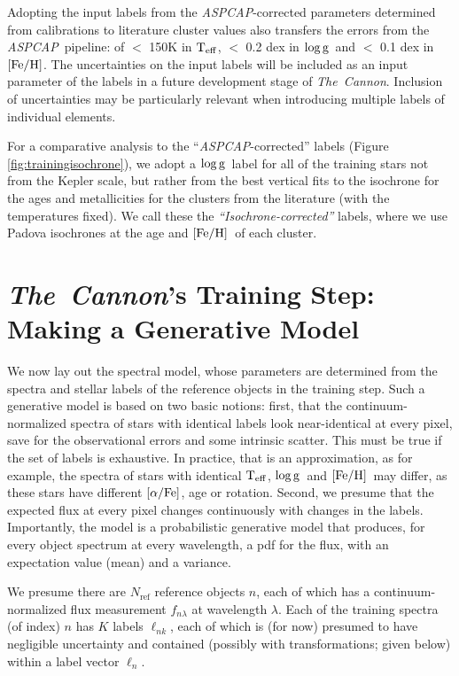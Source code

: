 \documentclass[12pt, preprint]{aastex}
\newcommand{\tc}{\textsl{The~Cannon}}
\newcommand{\aspcap}{\textsl{ASPCAP}}
\newcommand{\set}[1]{\bm{#1}}
\newcommand{\starlabel}{\ell}
\newcommand{\starlabelvec}{\set{\starlabel}}
\newcommand{\teff}{\mbox{$\rm T_{eff}$}}
\newcommand{\feh}{\mbox{$\rm [Fe/H]$}}
\newcommand{\alphafe}{\mbox{$\rm [\alpha/Fe]$}}
\newcommand{\logg}{\mbox{$\rm \log g$}}
\newcommand{\rfn}{\mathrm{ref}}
\begin{document}
Adopting the input labels from the \aspcap-corrected parameters determined from calibrations to literature cluster values also transfers the errors from the \aspcap\ pipeline: of $<$ 150K in \teff,  $<$ 0.2 dex in \logg\ and $<$ 0.1 dex in \feh.   
The uncertainties on the input labels will be included as an input parameter of the labels in a future development stage of \tc. Inclusion of uncertainties may be particularly relevant when introducing multiple labels of individual elements. 

For a comparative analysis to the ``\aspcap-corrected'' labels (Figure \ref{fig:trainingisochrone}), we adopt a \logg\ label for all of the training stars not from the Kepler scale, but rather from the best vertical fits to the isochrone for the ages and metallicities for the clusters from the literature (with the temperatures fixed).
We call these the \textit{``Isochrone-corrected''} labels, where we use Padova isochrones at the age and \feh\ of each cluster. 

\section{\tc 's Training Step: Making a Generative Model}
\label{sec:spectralmodel}

We now lay out the spectral model, whose parameters are determined 
from the spectra and stellar labels of the reference objects in the training step.
Such a generative model is based on two basic notions: first, that the continuum-normalized spectra of
stars with identical labels look near-identical at every pixel, save for the observational errors
and some intrinsic scatter. This must be true if the set of labels is exhaustive. 
In practice, that is an approximation, as for example, the spectra of stars with identical \teff , \logg \ and \feh\ may differ, 
as these stars have different \alphafe , age or rotation. Second, we presume that the expected flux at every pixel changes continuously
with changes in the labels.
Importantly, the model is a probabilistic generative model that produces,
for every object spectrum at every wavelength,
a pdf for the flux, with an expectation value (mean) and a variance.

We presume there are $N_\rfn$ reference objects $n$, each of which has
a continuum-normalized flux measurement $f_{n\lambda}$ at wavelength
$\lambda$. Each of the training spectra (of index) $n$ has $K$ labels $\starlabel_{nk}$, each of which
is (for now) presumed to have negligible uncertainty and contained (possibly with transformations; given below)
within a label vector $\starlabelvec_n$.
\end{document}
